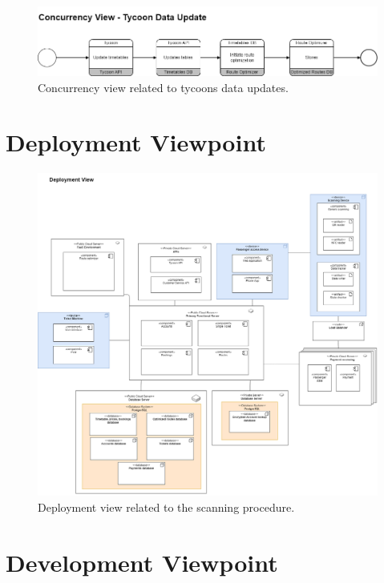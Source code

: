 \begin{figure}[H]
    \centering
    \includegraphics[width=\textwidth]{drawings/views_final_version/concurrency_view_3.png}
    \caption{Concurrency view related to tycoons data updates.}
    \label{fig:concurrency_view_3}
\end{figure}

\section{Deployment Viewpoint}

\begin{figure}[H]
    \centering
    \includegraphics[width=\textwidth]{drawings/views_final_version/deployment_view.png}
    \caption{Deployment view related to the scanning procedure.}
    \label{fig:deployment_view_scanning}
\end{figure}

\section{Development Viewpoint}